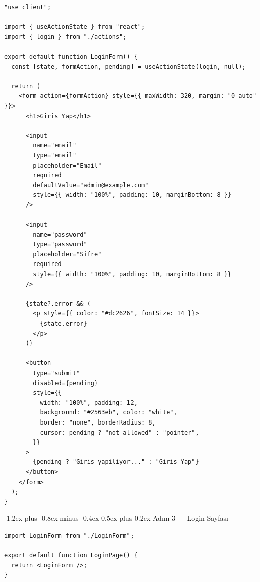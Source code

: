 \documentclass[12pt, a4paper]{article}
\makeatletter
\renewcommand{\subsection}{%
  \@startsection{subsection}{2}{\z@}%
    {-1.2ex plus -0.8ex minus -0.4ex}%
    {0.5ex plus 0.2ex}%
    {\normalfont\large\bfseries\sffamily\color{secondary}}%
}
\makeatother
\begin{document}
\begin{tcolorbox}[enhanced, colback=codebg, colframe=gray!30,
    colbacktitle=clientcol!85!black, coltitle=white, arc=4pt,
    title={\sffamily\bfseries\small src/app/login/LoginForm.tsx (Client)}]
\begin{lstlisting}[style=jsxstyle]
"use client";

import { useActionState } from "react";
import { login } from "./actions";

export default function LoginForm() {
  const [state, formAction, pending] = useActionState(login, null);

  return (
    <form action={formAction} style={{ maxWidth: 320, margin: "0 auto" }}>
      <h1>Giris Yap</h1>

      <input
        name="email"
        type="email"
        placeholder="Email"
        required
        defaultValue="admin@example.com"
        style={{ width: "100%", padding: 10, marginBottom: 8 }}
      />

      <input
        name="password"
        type="password"
        placeholder="Sifre"
        required
        style={{ width: "100%", padding: 10, marginBottom: 8 }}
      />

      {state?.error && (
        <p style={{ color: "#dc2626", fontSize: 14 }}>
          {state.error}
        </p>
      )}

      <button
        type="submit"
        disabled={pending}
        style={{
          width: "100%", padding: 12,
          background: "#2563eb", color: "white",
          border: "none", borderRadius: 8,
          cursor: pending ? "not-allowed" : "pointer",
        }}
      >
        {pending ? "Giris yapiliyor..." : "Giris Yap"}
      </button>
    </form>
  );
}
\end{lstlisting}
\end{tcolorbox}

\subsection{Adım 3 --- Login Sayfası}

\begin{tcolorbox}[enhanced, colback=codebg, colframe=gray!30,
    colbacktitle=primary!85!black, coltitle=white, arc=4pt,
    title={\sffamily\bfseries\small src/app/login/page.tsx (Server)}]
\begin{lstlisting}[style=jsxstyle]
import LoginForm from "./LoginForm";

export default function LoginPage() {
  return <LoginForm />;
}
\end{lstlisting}
\end{tcolorbox}
\end{document}

